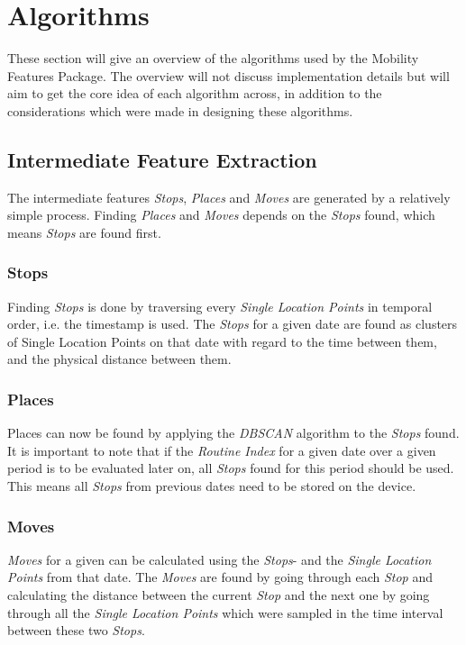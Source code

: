 \section{Algorithms}
These section will give an overview of the algorithms used by the Mobility Features Package. The overview will not discuss implementation details but will aim to get the core idea of each algorithm across, in addition to the considerations which were made in designing these algorithms.

\subsection{Intermediate Feature Extraction}
The intermediate features \textit{Stops}, \textit{Places} and \textit{Moves} are generated by a relatively simple process. Finding \textit{Places} and \textit{Moves} depends on the \textit{Stops} found, which means \textit{Stops} are found first. 

\subsubsection*{Stops}
Finding \textit{Stops} is done by traversing every \textit{Single Location Points} in temporal order, i.e. the timestamp is used. The \textit{Stops} for a given date are found as clusters of Single Location Points on that date with regard to the time between them, and the physical distance between them. 

\subsubsection*{Places}
Places can now be found by applying the \textit{DBSCAN} algorithm to the \textit{Stops} found. It is important to note that if the \textit{Routine Index} for a given date over a given period is to be evaluated later on, all \textit{Stops} found for this period should be used. This means all \textit{Stops} from previous dates need to be stored on the device. 

\subsubsection*{Moves}
\textit{Moves} for a given can be calculated using the \textit{Stops}- and the \textit{Single Location Points} from that date. The \textit{Moves} are found by going through each \textit{Stop} and calculating the distance between the current \textit{Stop} and the next one by going through all the \textit{Single Location Points} which were sampled in the time interval between these two \textit{Stops}.

